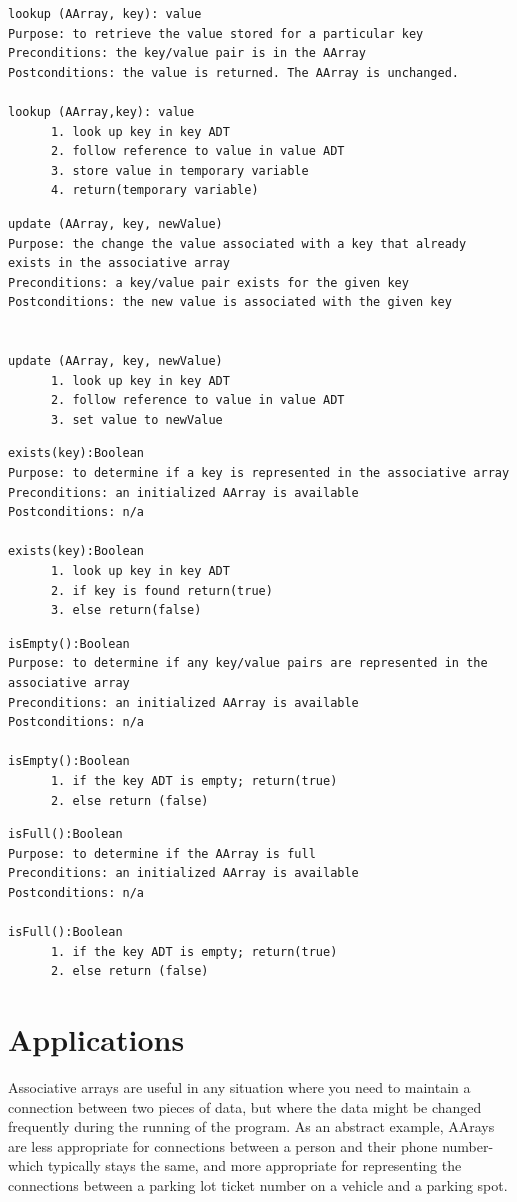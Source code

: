 \begin{lstlisting}
lookup (AArray, key): value
Purpose: to retrieve the value stored for a particular key
Preconditions: the key/value pair is in the AArray
Postconditions: the value is returned. The AArray is unchanged.

lookup (AArray,key): value
      1. look up key in key ADT
      2. follow reference to value in value ADT
      3. store value in temporary variable
      4. return(temporary variable)
\end{lstlisting}


\begin{lstlisting}
update (AArray, key, newValue)
Purpose: the change the value associated with a key that already exists in the associative array
Preconditions: a key/value pair exists for the given key
Postconditions: the new value is associated with the given key


update (AArray, key, newValue)
      1. look up key in key ADT
      2. follow reference to value in value ADT
      3. set value to newValue
\end{lstlisting}


\begin{lstlisting}
exists(key):Boolean
Purpose: to determine if a key is represented in the associative array
Preconditions: an initialized AArray is available
Postconditions: n/a

exists(key):Boolean
      1. look up key in key ADT
      2. if key is found return(true)
      3. else return(false)
\end{lstlisting}


\begin{lstlisting}
isEmpty():Boolean
Purpose: to determine if any key/value pairs are represented in the associative array
Preconditions: an initialized AArray is available
Postconditions: n/a

isEmpty():Boolean
      1. if the key ADT is empty; return(true)
      2. else return (false)
\end{lstlisting}


\begin{lstlisting}
isFull():Boolean
Purpose: to determine if the AArray is full
Preconditions: an initialized AArray is available
Postconditions: n/a

isFull():Boolean
      1. if the key ADT is empty; return(true)
      2. else return (false)
\end{lstlisting}


\section{Applications}
Associative arrays are useful in any situation where you need to maintain a connection between two pieces of data, but where the data might be changed frequently during the running of the program. As an abstract example, AArays are less appropriate for connections between a person and their phone number- which typically stays the same, and more appropriate for representing the connections between a parking lot ticket number on a vehicle and a parking spot.    

